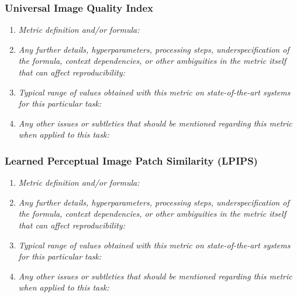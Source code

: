 \documentclass[a4paper,11pt]{article}
\begin{document}
        \subsubsection{Universal Image Quality Index}
            \begin{enumerate}[label=\alph*.]
                \item \textit{Metric definition and/or formula:}
                \bigskip
                \item \textit{Any further details, hyperparameters, processing steps, underspecification of the formula, context dependencies, or other ambiguities in the metric itself that can affect reproducibility:}
                \bigskip
                \item \textit{Typical range of values obtained with this metric on state-of-the-art systems for this particular task:}
                \bigskip
                \item \textit{Any other issues or subtleties that should be mentioned regarding this metric when applied to this task:}
                \bigskip
            \end{enumerate}
        \subsubsection{Learned Perceptual Image Patch Similarity (LPIPS)}
            \begin{enumerate}[label=\alph*.]
                \item \textit{Metric definition and/or formula:}
                \bigskip
                \item \textit{Any further details, hyperparameters, processing steps, underspecification of the formula, context dependencies, or other ambiguities in the metric itself that can affect reproducibility:}
                \bigskip
                \item \textit{Typical range of values obtained with this metric on state-of-the-art systems for this particular task:}
                \bigskip
                \item \textit{Any other issues or subtleties that should be mentioned regarding this metric when applied to this task:}
                \bigskip
            \end{enumerate}
\end{document}
